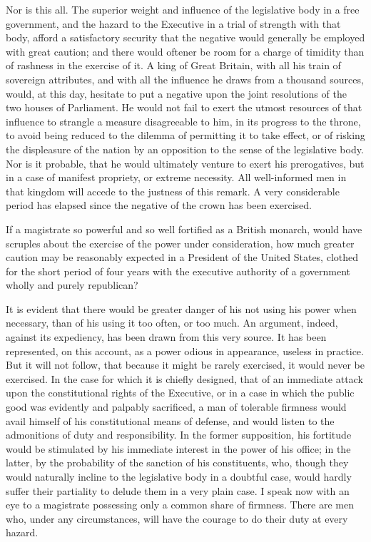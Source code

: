Nor is this all. 
The superior weight and influence of the legislative body in a free government, and the hazard to the Executive in a trial of strength with that body, afford a satisfactory security that the negative would generally be employed with great caution; and there would oftener be room for a charge of timidity than of rashness in the exercise of it. 
A king of Great Britain, with all his train of sovereign attributes, and with all the influence he draws from a thousand sources, would, at this day, hesitate to put a negative upon the joint resolutions of the two houses of Parliament. 
He would not fail to exert the utmost resources of that influence to strangle a measure disagreeable to him, in its progress to the throne, to avoid being reduced to the dilemma of permitting it to take effect, or of risking the displeasure of the nation by an opposition to the sense of the legislative body. 
Nor is it probable, that he would ultimately venture to exert his prerogatives, but in a case of manifest propriety, or extreme necessity. 
All well-informed men in that kingdom will accede to the justness of this remark. 
A very considerable period has elapsed since the negative of the crown has been exercised.

If a magistrate so powerful and so well fortified as a British monarch, would have scruples about the exercise of the power under consideration, how much greater caution may be reasonably expected in a President of the United States, clothed for the short period of four years with the executive authority of a government wholly and purely republican?

It is evident that there would be greater danger of his not using his power when necessary, than of his using it too often, or too much. 
An argument, indeed, against its expediency, has been drawn from this very source. 
It has been represented, on this account, as a power odious in appearance, useless in practice. 
But it will not follow, that because it might be rarely exercised, it would never be exercised. 
In the case for which it is chiefly designed, that of an immediate attack upon the constitutional rights of the Executive, or in a case in which the public good was evidently and palpably sacrificed, a man of tolerable firmness would avail himself of his constitutional means of defense, and would listen to the admonitions of duty and responsibility. 
In the former supposition, his fortitude would be stimulated by his immediate interest in the power of his office; in the latter, by the probability of the sanction of his constituents, who, though they would naturally incline to the legislative body in a doubtful case, would hardly suffer their partiality to delude them in a very plain case. 
I speak now with an eye to a magistrate possessing only a common share of firmness. 
There are men who, under any circumstances, will have the courage to do their duty at every hazard.

